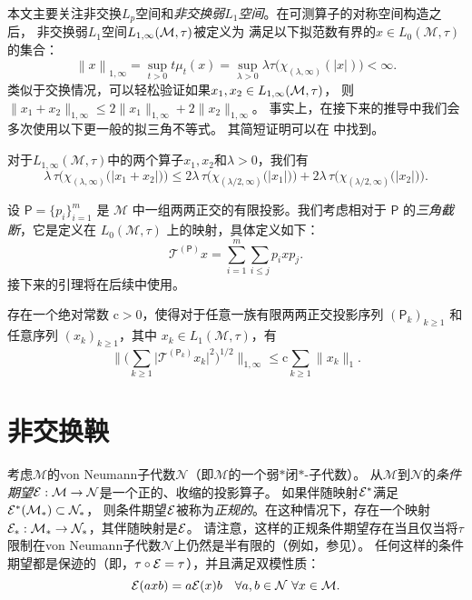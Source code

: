 本文主要关注非交换$L_p$空间和\emph{非交换弱$L_1$空间}。在可测算子的对称空间构造之后，
非交换弱$L_1$空间$L_{1,\infty}(\mathcal{M}, \tau)$被定义为
满足以下拟范数有界的$x \in L_0(\mathcal{M},\tau)$的集合：
\[ \left\|x\right\|_{1,\infty} = \sup_{t > 0} t \mu_t(x) = \sup_{\lambda > 0} \lambda \tau \big( \chi_{(\lambda, \infty)} (|x|) \big) < \infty. \]
类似于交换情况，可以轻松验证如果$x_1, x_2 \in L_{1,\infty}(\mathcal{M},\tau)$，
则 $\|x_1 +x_2\|_{1,\infty} \leq 2\|x_1\|_{1,\infty} +2\|x_2\|_{1,\infty}$。
事实上，在接下来的推导中我们会多次使用以下更一般的拟三角不等式。
其简短证明可以在 \cite[Lemma~1.2]{R3}中找到。

\begin{lemma} \label{Quasi-Triangle}
对于$L_{1,\infty}(\mathcal{M},\tau)$中的两个算子$x_1, x_2$和$\lambda > 0$，我们有
$$\lambda \, \tau \Big( \chi_{(\lambda,\infty)} \big( |x_1+x_2| \big) \Big) \le 2 \lambda \, \tau \Big( \chi_{(\lambda/2, \infty)} \big( |x_1| \big) \Big) + 2 \lambda \, \tau \Big( \chi_{(\lambda/2, \infty)} \big( |x_2| \big) \Big).$$
\end{lemma}

设 $\mathsf{P} = \{ p_i \}_{i=1}^m$ 是 $\mathcal{M}$ 中一组两两正交的有限投影。我们考虑相对于 $\mathsf{P}$ 的{\it 三角截断}，它是定义在 $L_0(\mathcal{M},\tau)$ 上的映射，具体定义如下：
\[ \mathcal{T}^{(\mathsf{P})} x = \sum_{i=1}^m \sum_{i\leq j} p_i x p_j. \]
接下来的引理将在后续中使用。

\begin{lemma} \label{Truncation} {\rm\cite[Proposition~1.4]{R3}} 存在一个绝对常数 $\mathrm{c}>0$，使得对于任意一族有限两两正交投影序列 $(\mathsf{P}_k)_{k\geq 1}$ 和任意序列 $(x_k)_{k\geq 1}$，其中 $x_k \in L_1(\mathcal{M},\tau)$，有
\[
 \Big\| \Big( \sum_{k\geq 1} \big| \mathcal{T}^{(\mathsf{P}_k)} x_k \big|^2 \Big)^{1/2} \Big\|_{1,\infty} \le \mathrm{c} \sum_{k\geq 1} \|x_k\|_1.
\]
\end{lemma}

\section{非交换鞅}
考虑$\mathcal{M}$的von Neumann子代数$\mathcal{N}$（即$\mathcal{M}$的一个弱$*$闭$*$-子代数）。
从$\mathcal{M}$到$\mathcal{N}$的\emph{条件期望}$\mathcal{E}:\mathcal{M}\to\mathcal{N}$是一个正的、收缩的投影算子。
如果伴随映射$\mathcal{E}^*$满足$\mathcal{E}^*(\mathcal{M}_*)\subset\mathcal{N}_*$，
则条件期望$\mathcal{E}$被称为\emph{正规的}。在这种情况下，存在一个映射$\mathcal{E}_*:\mathcal{M}_*\rightarrow\mathcal{N}_*$，其伴随映射是$\mathcal{E}$。
请注意，这样的正规条件期望存在当且仅当将$\tau$限制在von Neumann子代数$\mathcal{N}$上仍然是半有限的（例如，参见\cite[Theorem~3.4]{T}）。
任何这样的条件期望都是保迹的（即，$\tau\circ\mathcal{E}=\tau$），并且满足双模性质：
\[\mathcal{E}(axb)=a\mathcal{E}(x)b\quad\forall a,b\in\mathcal{N}\ \forall x\in\mathcal{M}.\]

